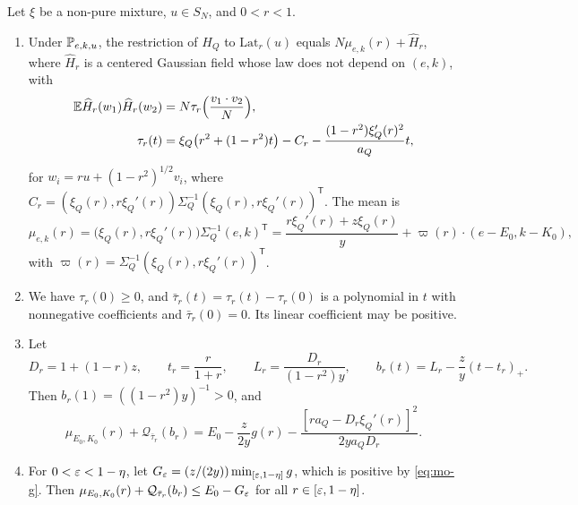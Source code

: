 \begin{lemma}\label{lem:mo-trial}
Let $\xi$ be a non-pure mixture, $u\in S_N$, and $0<r<1$.
\begin{enumerate}
\item[(a)] Under $\mathbb P_{e,k,u}$, the restriction of $H_Q$ to $\mathrm{Lat}_r(u)$ equals $N\mu_{e,k}(r)+\widehat H_r$, where $\widehat H_r$ is a centered Gaussian field whose law does not depend on $(e,k)$, with
\begin{equation}\label{eq:mo-lat-cov}
\begin{aligned}
\mathbb E\widehat H_r(w_1)\widehat H_r(w_2)&=N\tau_r\Bigl(\frac{v_1\cdot v_2}N\Bigr),\\
\tau_r(t)&=\xi_Q\bigl(r^2+(1-r^2)t\bigr)-C_r-\frac{(1-r^2)\xi_Q'(r)^2}{a_Q}t,
\end{aligned}
\end{equation}
for $w_i=ru+(1-r^2)^{1/2}v_i$, where $C_r=(\xi_Q(r),r\xi_Q'(r))\Sigma_Q^{-1}(\xi_Q(r),r\xi_Q'(r))^{\mathsf T}$. The mean is
\begin{equation}\label{eq:mo-lat-mean}
\mu_{e,k}(r)=\bigl(\xi_Q(r),r\xi_Q'(r)\bigr)\Sigma_Q^{-1}(e,k)^{\mathsf T}=\frac{r\xi_Q'(r)+z\xi_Q(r)}y+\varpi(r)\cdot(e-E_0,k-K_0),
\end{equation}
with $\varpi(r)=\Sigma_Q^{-1}(\xi_Q(r),r\xi_Q'(r))^{\mathsf T}$.
\item[(b)] We have $\tau_r(0)\ge0$, and $\bar\tau_r(t)=\tau_r(t)-\tau_r(0)$ is a polynomial in $t$ with nonnegative coefficients and $\bar\tau_r(0)=0$. Its linear coefficient may be positive.
\item[(c)] Let
\[
D_r=1+(1-r)z,\qquad t_r=\frac r{1+r},\qquad L_r=\frac{D_r}{(1-r^2)y},\qquad b_r(t)=L_r-\frac zy(t-t_r)_+.
\]
Then $b_r(1)=((1-r^2)y)^{-1}>0$, and
\begin{equation}\label{eq:mo-completed-square}
\mu_{E_0,K_0}(r)+\mathcal Q_{\bar\tau_r}(b_r)=E_0-\frac z{2y}g(r)-\frac{[ra_Q-D_r\xi_Q'(r)]^2}{2ya_QD_r}.
\end{equation}
\item[(d)] For $0<\varepsilon<1-\eta$, let $G_\varepsilon=(z/(2y))\min_{[\varepsilon,1-\eta]}g$, which is positive by \eqref{eq:mo-g}. Then $\mu_{E_0,K_0}(r)+\mathcal Q_{\bar\tau_r}(b_r)\le E_0-G_\varepsilon$ for all $r\in[\varepsilon,1-\eta]$.
\end{enumerate}
\end{lemma}

